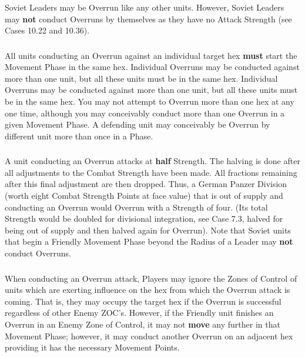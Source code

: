 \subsubsection{} Soviet Leaders may be Overrun like any other units. However, Soviet Leaders may \textbf{not} conduct Overruns by themselves as they have no Attack Strength (see Cases 10.22 and 10.36).

\subsubsection{} All units conducting an Overrun against an individual target hex \textbf{must} start the Movement Phase in the same hex. Individual Overruns may be conducted against more than one unit, but all these units must be in the same hex. Individual Overruns may be conducted against more than one unit, but all these units must be in the same hex. You may not attempt to Overrun more than one hex at any one time, although you may conceivably conduct more than one Overrun in a given Movement Phase. A defending unit may conceivably be Overrun by different unit more than once in a Phase.

\subsubsection{} A unit conducting an Overrun attacks at \textbf{half} Strength. The halving is done after all adjustments to the Combat Strength have been made. All fractions remaining after this final adjustment are then dropped. Thus, a German Panzer Division (worth eight Combat Strength Points at face value) that is out of supply and conducting an Overrun would Overrun with a Strength of four. (Its total Strength would be doubled for divisional integration, see Case 7.3, halved for being out of supply and then halved again for Overrun). Note that Soviet units that begin a Friendly Movement Phase beyond the Radius of a Leader may \textbf{not} conduct Overruns.

\subsubsection{} When conducting an Overrun attack, Players may ignore the Zones of Control of units which are exerting influence on the hex from which the Overrun attack is coming. That is, they may occupy the target hex if the Overrun is successful regardless of other Enemy ZOC's. However, if the Friendly unit finishes an Overrun in an Enemy Zone of Control, it may not \textbf{move} any further in that Movement Phase; however, it may conduct another Overrun on an adjacent hex providing it has the necessary Movement Points.


